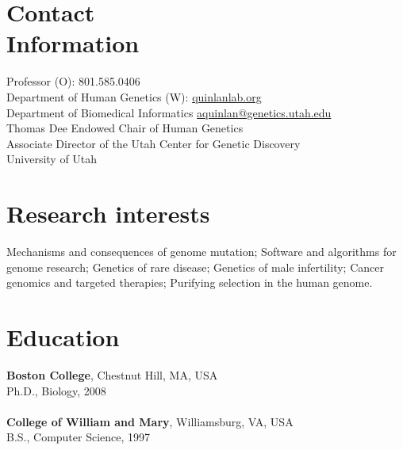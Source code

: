 \documentclass[margin,line]{cv}
\begin{document}
\begin{resume}
    \section{\mysidestyle Contact\\Information}
    Professor                                                         \hfill (O): 801.585.0406\\%
    Department of Human Genetics                                                    \hfill (W): \url{quinlanlab.org}\\%
    Department of Biomedical Informatics                                     \hfill \url{aquinlan@genetics.utah.edu} \\%
    Thomas Dee Endowed Chair of Human Genetics                                                                       \\%
    Associate Director of the Utah Center for Genetic Discovery                                                      \\%
    University of Utah                                                                                       \hfill  \\%

    \section{\mysidestyle Research interests} Mechanisms and consequences of genome mutation; Software and algorithms 
    for genome research; Genetics of rare disease; Genetics of male infertility; Cancer genomics and targeted therapies;
    Purifying selection in the human genome.
    \section{\mysidestyle Education}

    \textbf{Boston College}, Chestnut Hill, MA, USA\\
    Ph.D., Biology, 2008\\
    \\
    \textbf{College of William and Mary}, Williamsburg, VA, USA\\
    B.S., Computer Science, 1997


\end{resume}
\end{document}
